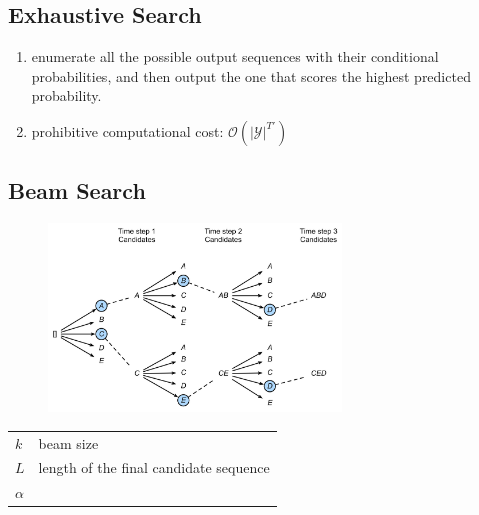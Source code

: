 \subsection{Exhaustive Search \cite{dnn-1}} \label{nmt: Exhaustive Search}

\begin{enumerate}
    \item enumerate all the possible output sequences with their conditional probabilities, and then output the one that scores the highest predicted probability.

    \item prohibitive computational cost: $\mathcal{O}(\left|\mathcal{Y}\right|^{T'})$

\end{enumerate}


\subsection{Beam Search \cite{dnn-1}} \label{nmt: Beam Search}

\begin{figure}[H]
    \centering
    \includegraphics[width=\linewidth, height=5cm, keepaspectratio]{Pictures/Recurrent-Neural-Networks/nmt-beam-search.jpg}
\end{figure}

\begin{customTableWrapper}{1.5}
\begin{longtable}{l p{8cm}}
    $k$ & beam size \\

    $L$ & length of the final candidate sequence \\

    $\alpha$ & \\

\end{longtable}
\end{customTableWrapper}

